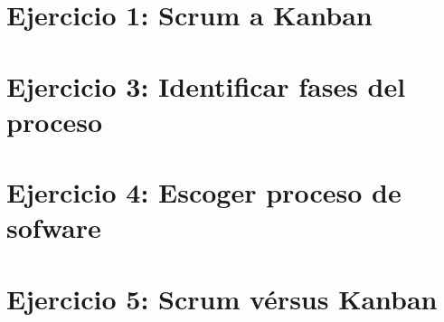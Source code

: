 

\section{Ejercicio 1: Scrum a Kanban}\label{sec:el-proceso-del-software-ej1}



%


\section{Ejercicio 3: Identificar fases del proceso}\label{sec:el-proceso-del-software-ej3}



\section{Ejercicio 4: Escoger proceso de sofware}\label{sec:el-proceso-del-software-ej4}



\section{Ejercicio 5: Scrum vérsus Kanban}\label{sec:el-proceso-del-software-ej5}

